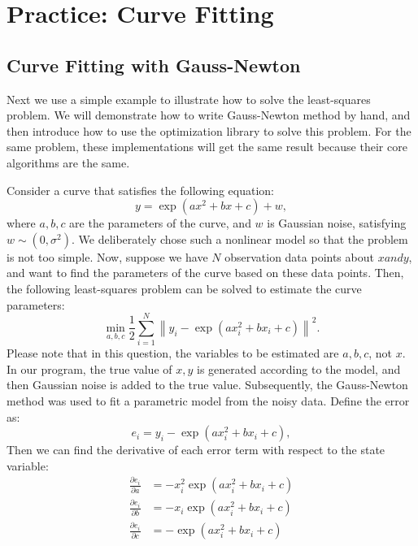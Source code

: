 \section{Practice: Curve Fitting}
\subsection{Curve Fitting with Gauss-Newton}
Next we use a simple example to illustrate how to solve the least-squares problem. We will demonstrate how to write Gauss-Newton method by hand, and then introduce how to use the optimization library to solve this problem. For the same problem, these implementations will get the same result because their core algorithms are the same.

Consider a curve that satisfies the following equation:
\[
y = \exp( ax^2 + bx + c ) + w,
\]
where $a, b, c$ are the parameters of the curve, and $w$ is Gaussian noise, satisfying $w \sim (0, \sigma^2)$. We deliberately chose such a nonlinear model so that the problem is not too simple. Now, suppose we have $N$ observation data points about $x and y$, and want to find the parameters of the curve based on these data points. Then, the following least-squares problem can be solved to estimate the curve parameters:
\begin{equation}
    \min \limits_{a,b,c} \frac{1}{2}\sum\limits_{i = 1}^N {{{\left\| {{y_i} - \exp \left( {ax_i^2 + bx_i + c} \right)} \right\|}^2}} .
\end{equation}
Please note that in this question, the variables to be estimated are $a, b, c$, not $x$. In our program, the true value of $x,y$ is generated according to the model, and then Gaussian noise is added to the true value. Subsequently, the Gauss-Newton method was used to fit a parametric model from the noisy data. Define the error as:
\begin{equation}
    e_i = y_i - \exp \left( {ax_i^2 + bx_i + c} \right),
\end{equation}
Then we can find the derivative of each error term with respect to the state variable:
\begin{equation}
    \begin{aligned}
        \frac{{\partial {e_i}}}{{\partial a}} &=  - x_i^2\exp \left( {ax_i^2 + b{x_i} + c} \right)\\
        \frac{{\partial e_i}}{{\partial b}} &=  - {x_i}\exp \left( {ax_i^2 + b{x_i} + c} \right)\\
        \frac{{\partial {e_i}}}{{\partial c}} &=  - \exp \left( {ax_i^2 + b{x_i} + c} \right)
    \end{aligned}
\end{equation}
